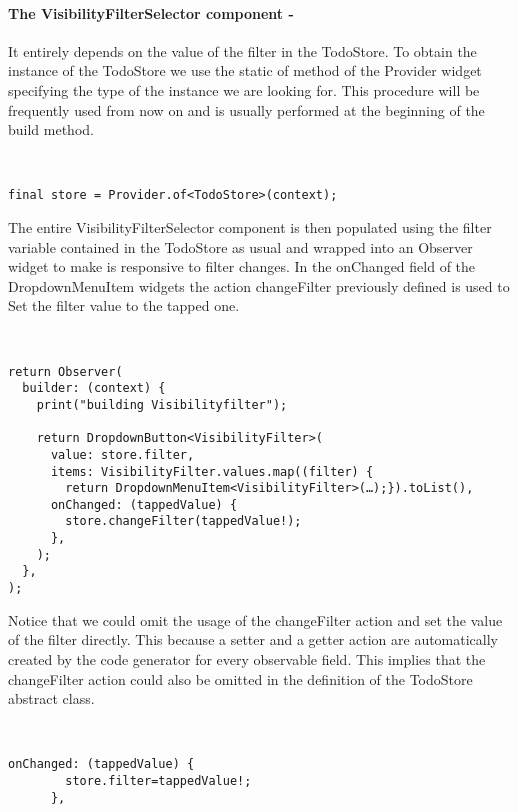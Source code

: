 \paragraph{The VisibilityFilterSelector component - }
\label{subpar:todo_app_bloc_core_state}It entirely depends on the value of the filter in the TodoStore. To obtain the instance of the TodoStore we use the static of method of the Provider widget specifying the type of the instance we are looking for. This procedure will be frequently used from now on and is usually performed at the beginning of the build method. 
\begin{code}
\mbox{}\\
 \mbox{}
		\label{code:2.14}
\begin{verbatim}
final store = Provider.of<TodoStore>(context);
\end{verbatim}
\mbox{}
\end{code}

The entire VisibilityFilterSelector component is then populated using the filter  variable contained in the TodoStore as usual and wrapped into an Observer widget to make is responsive to filter changes. In the onChanged field of the DropdownMenuItem widgets the action changeFilter previously defined is used to
Set the filter value to the tapped one.
\begin{code}
\mbox{}\\
 \mbox{}
		\label{code:2.14}
\begin{verbatim}
return Observer(
  builder: (context) {
    print("building Visibilityfilter");

    return DropdownButton<VisibilityFilter>(
      value: store.filter,
      items: VisibilityFilter.values.map((filter) {
        return DropdownMenuItem<VisibilityFilter>(…);}).toList(),
      onChanged: (tappedValue) {
        store.changeFilter(tappedValue!);
      },
    );
  },
);
\end{verbatim}
\mbox{}
\end{code}

Notice that we could omit the usage of the changeFilter action and set the value of the filter directly. This because a setter and a getter action are automatically created by the code generator for every observable field. This implies that the changeFilter action could also be omitted in the definition of the TodoStore abstract class.
\begin{code}
\mbox{}\\
 \mbox{}
		\label{code:2.14}
\begin{verbatim}
onChanged: (tappedValue) {
        store.filter=tappedValue!; 
      },
\end{verbatim}
\mbox{}
\end{code}


